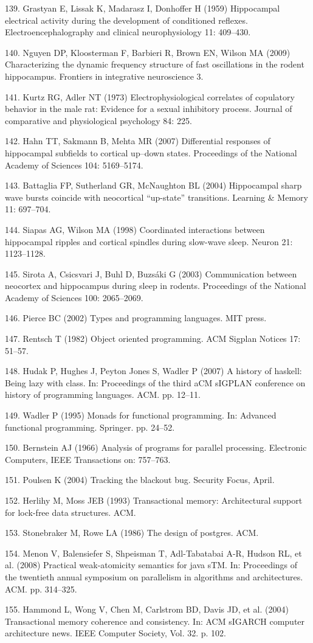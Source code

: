 \documentclass[]{article}
\begin{document}
139. Grastyan E, Lissak K, Madarasz I, Donhoffer H (1959) Hippocampal
electrical activity during the development of conditioned reflexes.
Electroencephalography and clinical neurophysiology 11: 409--430.

140. Nguyen DP, Kloosterman F, Barbieri R, Brown EN, Wilson MA (2009)
Characterizing the dynamic frequency structure of fast oscillations in
the rodent hippocampus. Frontiers in integrative neuroscience 3.

141. Kurtz RG, Adler NT (1973) Electrophysiological correlates of
copulatory behavior in the male rat: Evidence for a sexual inhibitory
process. Journal of comparative and physiological psychology 84: 225.

142. Hahn TT, Sakmann B, Mehta MR (2007) Differential responses of
hippocampal subfields to cortical up--down states. Proceedings of the
National Academy of Sciences 104: 5169--5174.

143. Battaglia FP, Sutherland GR, McNaughton BL (2004) Hippocampal sharp
wave bursts coincide with neocortical ``up-state'' transitions. Learning
\& Memory 11: 697--704.

144. Siapas AG, Wilson MA (1998) Coordinated interactions between
hippocampal ripples and cortical spindles during slow-wave sleep. Neuron
21: 1123--1128.

145. Sirota A, Csicsvari J, Buhl D, Buzs{á}ki G (2003) Communication
between neocortex and hippocampus during sleep in rodents. Proceedings
of the National Academy of Sciences 100: 2065--2069.

146. Pierce BC (2002) Types and programming languages. MIT press.

147. Rentsch T (1982) Object oriented programming. ACM Sigplan Notices
17: 51--57.

148. Hudak P, Hughes J, Peyton Jones S, Wadler P (2007) A history of
haskell: Being lazy with class. In: Proceedings of the third aCM sIGPLAN
conference on history of programming languages. ACM. pp. 12--11.

149. Wadler P (1995) Monads for functional programming. In: Advanced
functional programming. Springer. pp. 24--52.

150. Bernstein AJ (1966) Analysis of programs for parallel processing.
Electronic Computers, IEEE Transactions on: 757--763.

151. Poulsen K (2004) Tracking the blackout bug. Security Focus, April.

152. Herlihy M, Moss JEB (1993) Transactional memory: Architectural
support for lock-free data structures. ACM.

153. Stonebraker M, Rowe LA (1986) The design of postgres. ACM.

154. Menon V, Balensiefer S, Shpeisman T, Adl-Tabatabai A-R, Hudson RL,
et al. (2008) Practical weak-atomicity semantics for java sTM. In:
Proceedings of the twentieth annual symposium on parallelism in
algorithms and architectures. ACM. pp. 314--325.

155. Hammond L, Wong V, Chen M, Carlstrom BD, Davis JD, et al. (2004)
Transactional memory coherence and consistency. In: ACM sIGARCH computer
architecture news. IEEE Computer Society, Vol. 32. p. 102.
\end{document}
